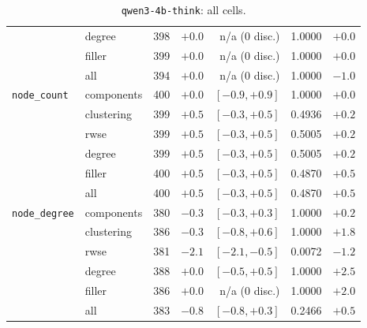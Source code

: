 \begin{table}[H]
{\begin{tabular}{llrrrrr}
 & degree & 398 & $+0.0$ & n/a ($0$ disc.) & 1.0000 & $+0.0$ \\
 & filler & 399 & $+0.0$ & n/a ($0$ disc.) & 1.0000 & $+0.0$ \\
 & all & 394 & $+0.0$ & n/a ($0$ disc.) & 1.0000 & $-1.0$ \\
\midrule
\texttt{node\_count} & components & 400 & $+0.0$ & $[-0.9, +0.9]$ & 1.0000 & $+0.0$ \\
 & clustering & 399 & $+0.5$ & $[-0.3, +0.5]$ & 0.4936 & $+0.2$ \\
 & rwse & 399 & $+0.5$ & $[-0.3, +0.5]$ & 0.5005 & $+0.2$ \\
 & degree & 399 & $+0.5$ & $[-0.3, +0.5]$ & 0.5005 & $+0.2$ \\
 & filler & 400 & $+0.5$ & $[-0.3, +0.5]$ & 0.4870 & $+0.5$ \\
 & all & 400 & $+0.5$ & $[-0.3, +0.5]$ & 0.4870 & $+0.5$ \\
\midrule
\texttt{node\_degree} & components & 380 & $-0.3$ & $[-0.3, +0.3]$ & 1.0000 & $+0.2$ \\
 & clustering & 386 & $-0.3$ & $[-0.8, +0.6]$ & 1.0000 & $+1.8$ \\
 & rwse & 381 & $-2.1$ & $[-2.1, -0.5]$ & 0.0072 & $-1.2$ \\
 & degree & 388 & $+0.0$ & $[-0.5, +0.5]$ & 1.0000 & $+2.5$ \\
 & filler & 386 & $+0.0$ & n/a ($0$ disc.) & 1.0000 & $+2.0$ \\
 & all & 383 & $-0.8$ & $[-0.8, +0.3]$ & 0.2466 & $+0.5$ \\
\bottomrule
\end{tabular}}
\caption{\texttt{qwen3-4b-think}: all cells.}
\end{table}

